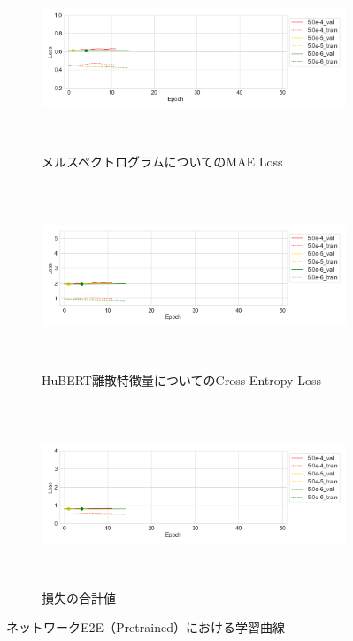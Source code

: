 \begin{figure}[bt]
    \centering
    \begin{subfigure}{\linewidth}
        \centering
        \includegraphics[height=55mm]{./figure/sec4/learning_curves/10_11_12/mel_loss.png}
        \caption{メルスペクトログラムについてのMAE Loss}
        \label{sec4:fig:learning_curve_method_10_11_12_val_mel_loss}
    \end{subfigure}
    \begin{subfigure}{\linewidth}
        \centering
        \includegraphics[height=55mm]{./figure/sec4/learning_curves/10_11_12/ssl_feature_cluster_loss.png}
        \caption{HuBERT離散特徴量についてのCross Entropy Loss}
        \label{sec4:fig:learning_curve_method_10_11_12_val_ssl_feature_cluster_loss}
    \end{subfigure}
    \begin{subfigure}{\linewidth}
        \centering
        \includegraphics[height=55mm]{./figure/sec4/learning_curves/10_11_12/total_loss.png}
        \caption{損失の合計値}
        \label{sec4:fig:learning_curve_method_10_11_12_val_total_loss}
    \end{subfigure}
    \caption{ネットワークE2E（Pretrained）における学習曲線}
    \label{sec4:fig:learning_curve_method_10_11_12_val_losses}
\end{figure}

